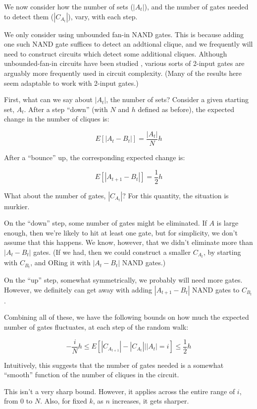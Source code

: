 \documentclass[12pt]{article}
\theoremstyle{definition}
\begin{document}
We now consider how the number of sets ($|A_t|$), and
the number of gates needed to detect them ($|C_{A_t}|$),
vary, with each step.

We only consider using unbounded fan-in NAND gates.
This is because adding one such NAND gate suffices to detect an
addtional clique, and we frequently will need to construct circuits which detect
some additional cliques.
Although unbounded-fan-in circuits have been studied
\cite{wegener1991complexity}\cite{allender1994depth}, various sorts of 2-input gates are arguably
more frequently used in circuit complexity. (Many of the results here
seem adaptable to work with 2-input gates.)

First, what can we say about $|A_t|$, the number of sets?
Consider a given starting set, $A_t$.
After a step ``down'' (with $N$ and $h$ defined as before),
the expected change in the number of cliques is:

\[
E[|A_t - B_t|] = \frac{|A_t|}{N}h
\]

After a ``bounce'' up, the corresponding expected change is:

\[
E[|A_{t+1} - B_t|] = \frac{1}{2}h
\]

What about the number of gates, $|C_{A_t}|$? For this quantity,
the situation is murkier.

On the ``down'' step, some number of gates might be eliminated.
If $A$ is large enough, then we're likely to hit at least one gate,
but for simplicity, we don't assume that this happens.
We know, however, that we didn't eliminate more than $|A_t - B_t|$
gates. (If we had, then we could construct a smaller $C_{A_t}$,
by starting with $C_{B_t}$, and ORing it with $|A_t - B_t|$
NAND gates.)

On the ``up'' step, somewhat symmetrically, we probably will
need more gates. However, we definitely can get away with
adding $|A_{t+1} - B_t|$ NAND gates to $C_{B_t}$.

Combining all of these, we have the following bounds on how much the
expected number of gates fluctuates, at each step of the random walk:

\[
-\frac{i}{N}h \le E[ |C_{A_{t+1}}| - |C_{A_t}| | |A_t|=i ] \le \frac{1}{2}h
\]

Intuitively, this suggests that the number
of gates needed is a somewhat ``smooth'' function of the
number of cliques in the circuit.

This isn't a very sharp bound. However, it applies across the entire
range of $i$, from 0 to $N$. Also, for fixed $k$, as $n$ increases,
it gets sharper.
\end{document}
